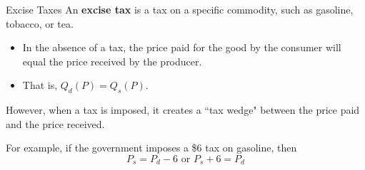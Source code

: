 \documentclass[11pt,t]{beamer}
\begin{document}
\begin{frame}{Excise Taxes}
  An \textbf{excise tax} is a tax on a specific commodity, such as gasoline, tobacco, or tea.

  \begin{itemize}
    \item In the absence of a tax, the price paid for the good by the consumer will equal the price received by the producer.
    
    \item That is, $Q_d(P)=Q_s(P)$.
  \end{itemize}

  \bigskip \pause
  However, when a tax is imposed, it creates a ``tax wedge" between the price paid and the price received.

  For example, if the government imposes a \$6 tax on gasoline, then
  $$
    P_s=P_d-6 \text{ or } P_s+6=P_d
  $$
\end{frame}
\end{document}
